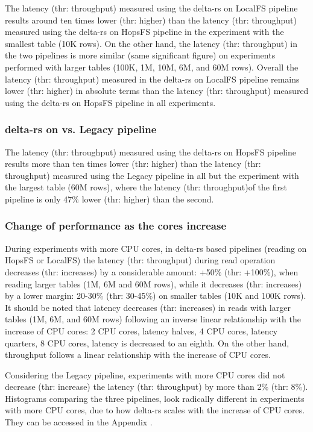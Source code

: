 The latency (thr: throughput) measured using the delta-rs on \gls{LocalFS} pipeline results around ten times lower (thr: higher) than the latency (thr: throughput) measured using the delta-rs on \gls{HopsFS} pipeline in the experiment with the smallest table (10K rows). On the other hand, the latency (thr: throughput) in the two pipelines is more similar (same significant figure) on experiments performed with larger tables (100K, 1M, 10M, 6M, and 60M rows). Overall the latency (thr: throughput) measured in the delta-rs on \gls{LocalFS} pipeline remains lower (thr: higher) in absolute terms than the latency (thr: throughput) measured using the delta-rs on \gls{HopsFS} pipeline in all experiments.

\subsubsection*{delta-rs on  vs. Legacy pipeline}

The latency (thr: throughput) measured using the delta-rs on \gls{HopsFS} pipeline results more than ten times lower (thr: higher) than the latency (thr: throughput) measured using the Legacy pipeline in all but the experiment with the largest table (60M rows), where the latency (thr: throughput)of the first pipeline is only 47\% lower (thr: higher) than the second. 

\subsubsection*{Change of performance as the  cores increase}

During experiments with more \gls{CPU} cores, in delta-rs based pipelines (reading on \gls{HopsFS} or \gls{LocalFS}) the latency (thr: throughput) during read operation decreases (thr: increases) by a considerable amount: +50\% (thr: +100\%), when reading larger tables (1M, 6M and 60M rows), while it decreases (thr: increases) by a lower margin: 20-30\% (thr: 30-45\%) on smaller tables (10K and 100K rows). It should be noted that latency decreases (thr: increases) in reads with larger tables (1M, 6M, and 60M rows) following an inverse linear relationship with the increase of \gls{CPU} cores: 2 \gls{CPU} cores, latency halves, 4 \gls{CPU} cores, latency quarters, 8 \gls{CPU} cores, latency is decreased to an eighth. On the other hand, throughput follows a linear relationship with the increase of \gls{CPU} cores.

Considering the Legacy pipeline, experiments with more \gls{CPU} cores did not decrease (thr: increase) the latency (thr: throughput) by more than 2\% (thr: 8\%). Histograms comparing the three pipelines, look radically different in experiments with more \gls{CPU} cores, due to how delta-rs scales with the increase of \gls{CPU} cores. They can be accessed in the Appendix .

